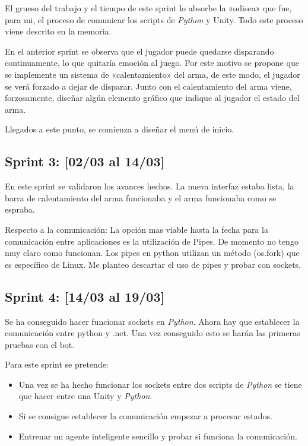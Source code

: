 El grueso del trabajo y el tiempo de este sprint lo absorbe la «odisea» que fue, para mi, el proceso de comunicar los scripts de \emph{Python} y Unity. Todo este proceso viene descrito en la memoria.

En el anterior sprint se observa que el jugador puede quedarse disparando continuamente, lo que quitaría emoción al juego. Por este motivo se propone que se implemente un sistema de «calentamiento» del arma, de este modo, el jugador se verá forzado a dejar de disparar. Junto con el calentamiento del arma viene, forzosamente, diseñar algún elemento gráfico que indique al jugador el estado del arma.

Llegados a este punto, se comienza a diseñar el menú de inicio.


\subsection{Sprint 3:  [02/03 al 14/03]}


En este sprint se validaron los avances hechos. La nueva interfaz estaba lista, la barra de calentamiento del arma funcionaba y el arma funcionaba como se espraba.

Respecto a la comunicación:
La opción mas viable hasta la fecha para la comunicación entre aplicaciones es la utilización de Pipes. De momento no tengo muy claro como funcionan. Los pipes en python utilizan un método (os.fork) que es específico de Linux. Me planteo descartar el uso de pipes y probar con sockets.


\subsection{Sprint 4:  [14/03 al 19/03]}

Se ha conseguido hacer funcionar sockets en \emph{Python}. Ahora hay que establecer la comunicación entre python y .net. Una vez conseguido esto se harán las primeras pruebas con el bot.

Para este sprint se pretende:
\begin{itemize}
    \item Una vez se ha hecho funcionar los sockets entre dos scripts de \emph{Python} se tiene que hacer entre una Unity y \emph{Python}.
    \item Si se consigue establecer la comunicación empezar a procesar estados.
    \item Entrenar un agente inteligente sencillo y probar si funciona la comunicación.
\end{itemize}



